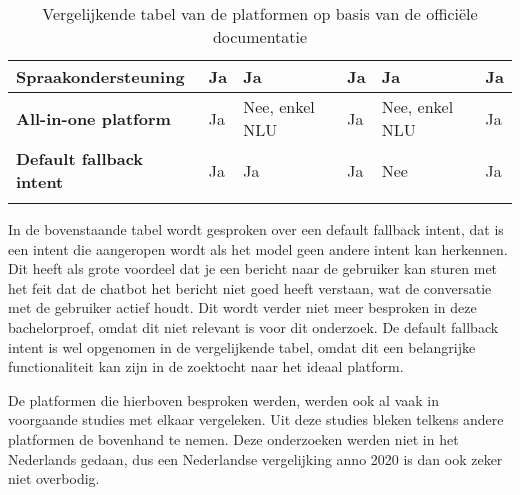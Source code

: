 \begin{center}
\begin{longtable}{| P{2.2cm} | p{2.2cm} |  p{2.2cm} | p{2.2cm} | p{2.2cm} | p{2.2cm} |}
        \textbf{Spraakondersteuning}                                   & Ja                                                                      & Ja                             & Ja                                           & Ja                                     & Ja                                            \\  \hline
        \textbf{All-in-one platform}                                   & Ja                                                                      & Nee, enkel NLU                 & Ja                                           & Nee, enkel NLU                         & Ja                                            \\  \hline
        \textbf{Default fallback intent}                               & Ja                                                                      & Ja                             & Ja                                           & Nee                                    & Ja   \\ \hline    
        \caption{Vergelijkende tabel van de platformen op basis van de officiële documentatie}                                    
    \end{longtable}
\label{tbl:platformen}
\end{center}

In de bovenstaande tabel wordt gesproken over een default fallback intent, dat is een intent die aangeropen wordt als het model geen andere intent kan herkennen. Dit heeft als grote voordeel dat je een bericht naar de gebruiker kan sturen met het feit dat de chatbot het bericht niet goed heeft verstaan, wat de conversatie met de gebruiker actief houdt. Dit wordt verder niet meer besproken in deze bachelorproef, omdat dit niet relevant is voor dit onderzoek. De default fallback intent is wel opgenomen in de vergelijkende tabel, omdat dit een belangrijke functionaliteit kan zijn in de zoektocht naar het ideaal platform.

De platformen die hierboven besproken werden, werden ook al vaak in voorgaande studies met elkaar vergeleken. Uit deze studies bleken telkens andere platformen de bovenhand te nemen. Deze onderzoeken werden niet in het Nederlands gedaan, dus een Nederlandse vergelijking anno 2020 is dan ook zeker niet overbodig.

